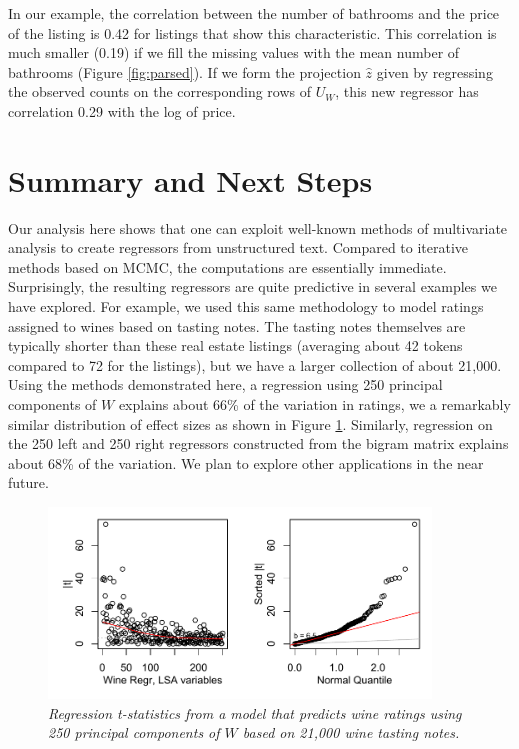 \documentclass[12pt]{article}
\begin{document}
 
 In our example, the correlation between the number of bathrooms and the price of the listing is 0.42 for listings that show this characteristic.  This correlation is much smaller (0.19) if we fill the missing values with the mean number of bathrooms (Figure  \ref{fig:parsed}).  If we form the projection $\hat{z}$ given by regressing the observed counts on the corresponding rows of $U_W$, this new regressor has correlation 0.29 with the log of price.



\section{Summary and Next Steps}
\label{sec:disc}
  
 Our analysis here shows that one can exploit well-known methods of multivariate analysis to create regressors from unstructured text.  Compared to iterative methods based on MCMC, the computations are essentially immediate.  Surprisingly, the resulting regressors are quite predictive in several examples we have explored.  For example, we used this same methodology to model ratings assigned to wines based on tasting notes.  The tasting notes themselves are typically shorter than these real estate listings (averaging about 42 tokens compared to 72 for the listings), but we have a larger collection of about 21,000.  Using the methods demonstrated here, a regression using 250 principal components of $W$ explains about 66\% of the variation in ratings, we a remarkably similar distribution of effect sizes as shown in Figure \ref{fig:wine}.  Similarly, regression on the 250 left and 250 right regressors constructed from the bigram matrix explains about 68\% of the variation.  We plan to explore other applications in the near future.
 
 
 \begin{figure}
 \caption{ \label{fig:wine} \sl Regression t-statistics from a model that predicts wine ratings using 250 principal components of $W$ based on 21,000 wine tasting notes.}
 
 \centerline{
   \includegraphics[width=4in]{figures/wine.pdf}
   }
  \end{figure} 
  
\end{document}
